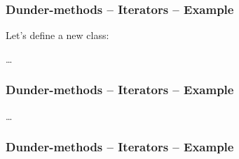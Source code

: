 \documentclass{beamer}
\begin{document}
\begin{frame}
  \frametitle{Dunder-methods -- Iterators -- Example}
  Let's define a new class: 
  
  \dots
\end{frame}
\begin{frame}
  \frametitle{Dunder-methods -- Iterators -- Example}
  \vspace{-10mm}
  
  \dots
\end{frame}
\begin{frame}
  \frametitle{Dunder-methods -- Iterators -- Example}
  \vspace{-10mm}
  
\end{frame}
\end{document}
